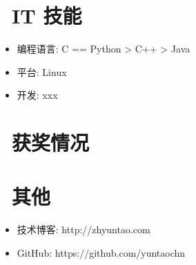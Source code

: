 \documentclass{resume}
\begin{document}

\section{\faCogs\ IT 技能}
\begin{itemize}[parsep=0.5ex]
  \item 编程语言: C == Python > C++ > Java
  \item 平台: Linux
  \item 开发: xxx
\end{itemize}

\section{\faHeartO\ 获奖情况}

\section{\faInfo\ 其他}
\begin{itemize}[parsep=0.5ex]
  \item 技术博客: http://zhyuntao.com
  \item GitHub: https://github.com/yuntaochn
\end{itemize}

%
%
\end{document}
